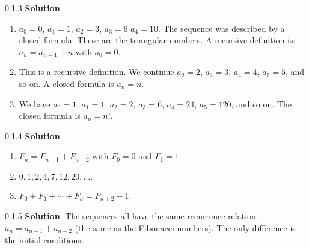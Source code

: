 \documentclass[11pt,]{book}
\theoremstyle{ptxplainnotitle}
\theoremstyle{ptxplaintitle}
\theoremstyle{ptxdefinitionnotitle}
\theoremstyle{ptxdefinitiontitle}
\theoremstyle{ptxdefinitionnotitle}
\theoremstyle{ptxdefinitiontitle}
\theoremstyle{ptxdefinitionnotitle}
\theoremstyle{ptxdefinitiontitle}
\theoremstyle{ptxdefinitiontitlenonumber}
\theoremstyle{ptxdefinitiontitlenonumber}
\numberwithin{equation}{chapter}
\begin{document}
\begin{divisionexercise}{0.1.3}
\textbf{Solution}.\quad%
\hypertarget{p-125}{}%
\leavevmode%
\begin{enumerate}[label=(\alph*)]
\item\hypertarget{li-85}{}\hypertarget{p-126}{}%
\(a_0 = 0\), \(a_1 = 1\), \(a_2 = 3\), \(a_3 = 6\)  \(a_4 = 10\). The sequence was described by a closed formula.  These are the triangular numbers.  A recursive definition is: \(a_n = a_{n-1} + n\) with \(a_0 = 0\).%
\item\hypertarget{li-86}{}\hypertarget{p-127}{}%
This is a recursive definition.  We continue \(a_2 = 2\), \(a_3 = 3\), \(a_4 = 4\), \(a_5 = 5\), and so on.  A closed formula is \(a_n = n\).%
\item\hypertarget{li-87}{}\hypertarget{p-128}{}%
We have \(a_0 = 1\), \(a_1 = 1\), \(a_2 = 2\), \(a_3 = 6\), \(a_4 = 24\), \(a_5 = 120\), and so on.  The closed formula is \(a_n = n!\).%
\end{enumerate}
%
\end{divisionexercise}%
\begin{divisionexercise}{0.1.4}
\textbf{Solution}.\quad%
\hypertarget{p-134}{}%
\leavevmode%
\begin{enumerate}[label=(\alph*)]
\item\hypertarget{li-91}{}\(F_n = F_{n-1} + F_{n-2}\) with \(F_0 = 0\) and \(F_1 = 1\).%
\item\hypertarget{li-92}{}\(0, 1, 2, 4, 7, 12, 20, \ldots.\)%
\item\hypertarget{li-93}{}\(F_0 + F_1 + \cdots + F_n = F_{n+2} - 1.\)%
\end{enumerate}
%
\end{divisionexercise}%
\begin{divisionexercise}{0.1.5}
\textbf{Solution}.\quad%
\hypertarget{p-137}{}%
The sequences all have the same recurrence relation: \(a_n = a_{n-1} + a_{n-2}\) (the same as the Fibonacci numbers). The only difference is the initial conditions.%
\end{divisionexercise}%
\end{document}
